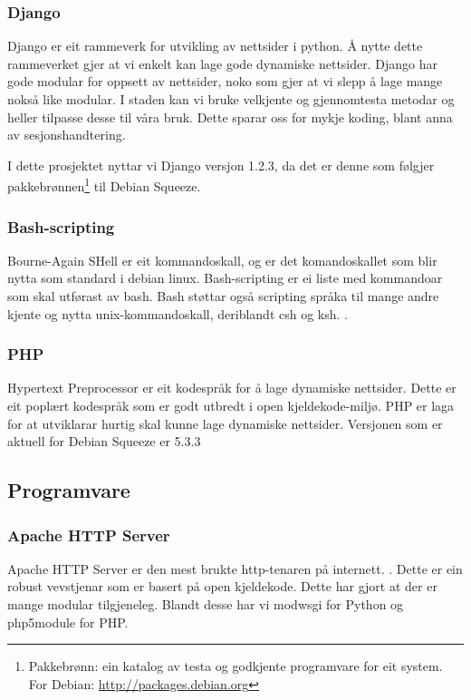 \documentclass[nynorsk,12pt,a4paper,oneside]{book}
\begin{document}
\subsubsection{Django}
Django er eit rammeverk for utvikling av nettsider i python. Å nytte dette rammeverket gjer at vi enkelt kan lage gode dynamiske nettsider. Django har gode modular for oppsett av nettsider, noko som gjer at vi slepp å lage mange nokså like modular. I staden kan vi bruke velkjente og gjennomtesta metodar og heller tilpasse desse til våra bruk. Dette sparar oss for mykje koding, blant anna av sesjonshandtering.\cite{djangowww, djangosessions}

I dette prosjektet nyttar vi Django versjon 1.2.3, da det er denne som følgjer pakkebrønnen\footnote{Pakkebrønn: ein katalog av testa og godkjente programvare for eit system. \\For Debian:  \url{http://packages.debian.org} } til Debian Squeeze. \cite{djangopkg}

\subsubsection{Bash-scripting}
Bourne-Again SHell er eit kommandoskall, og er det komandoskallet som blir nytta som standard i debian linux. \cite{debbash, bashwww} Bash-scripting er ei liste med kommandoar som skal utførast av bash. Bash støttar også scripting språka til mange andre kjente og nytta unix-kommandoskall, deriblandt csh og ksh. \cite{bashabout}.

\subsubsection{PHP}
Hypertext Preprocessor er eit kodespråk for å lage dynamiske nettsider. Dette er eit poplært kodespråk som er godt utbredt i open kjeldekode-miljø. PHP er laga for at utviklarar hurtig skal kunne lage dynamiske nettsider. \cite{phpwww} Versjonen som er aktuell for Debian Squeeze er 5.3.3 \cite{phppkg}

\subsection{Programvare}
\subsubsection{Apache HTTP Server}
Apache HTTP Server er den mest brukte http-tenaren på internett. \cite{apahcetraf}. Dette er ein robust vevstjenar som er basert på open kjeldekode. Dette har gjort at der er mange modular tilgjeneleg. Blandt desse har vi mod\textunderscore wsgi for Python og php5\textunderscore module for PHP. \cite{modwsgi, phpmodule}
\end{document}

